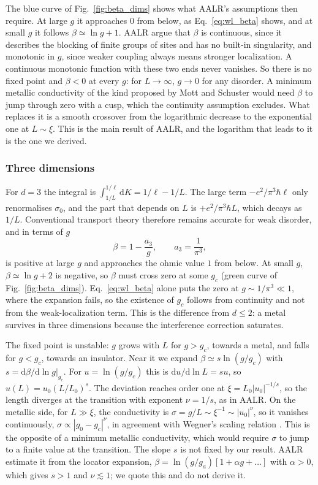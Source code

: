 The blue curve of Fig.~\ref{fig:beta_dims} shows what AALR's assumptions then require. At large $g$ it approaches $0$ from below, as Eq.~\eqref{eq:wl_beta} shows, and at small $g$ it follows $\beta\simeq\ln g+1$. AALR argue that $\beta$ is continuous, since it describes the blocking of finite groups of sites and has no built-in singularity, and monotonic in $g$, since weaker coupling always means stronger localization. A continuous monotonic function with these two ends never vanishes. So there is no fixed point and $\beta<0$ at every $g$: for $L\to\infty$, $g\to0$ for any disorder. A minimum metallic conductivity of the kind proposed by Mott and Schuster would need $\beta$ to jump through zero with a cusp, which the continuity assumption excludes. What replaces it is a smooth crossover from the logarithmic decrease to the exponential one at $L\sim\xi$. This is the main result of AALR, and the logarithm that leads to it is the one we derived.

\subsubsection*{Three dimensions}

For $d=3$ the integral is $\int_{1/L}^{1/\ell}\mathrm{d}K=1/\ell-1/L$. The large term $-e^2/\pi^3\hbar\ell$ only renormalises $\sigma_0$, and the part that depends on $L$ is $+e^2/\pi^3\hbar L$, which decays as $1/L$. Conventional transport theory therefore remains accurate for weak disorder, and in terms of $g$
\[
\beta=1-\frac{a_3}{g},\qquad a_3=\frac1{\pi^3},
\]
is positive at large $g$ and approaches the ohmic value $1$ from below. At small $g$, $\beta\simeq\ln g+2$ is negative, so $\beta$ must cross zero at some $g_c$ (green curve of Fig.~\ref{fig:beta_dims}). Eq.~\eqref{eq:wl_beta} alone puts the zero at $g\sim1/\pi^3\ll1$, where the expansion fails, so the existence of $g_c$ follows from continuity and not from the weak-localization term. This is the difference from $d\le2$: a metal survives in three dimensions because the interference correction saturates.

The fixed point is unstable: $g$ grows with $L$ for $g>g_c$, towards a metal, and falls for $g<g_c$, towards an insulator. Near it we expand $\beta\simeq s\ln(g/g_c)$ with $s=\mathrm{d}\beta/\mathrm{d}\ln g|_{g_c}$. For $u=\ln(g/g_c)$ this is $\mathrm{d}u/\mathrm{d}\ln L=su$, so $u(L)=u_0(L/L_0)^s$. The deviation reaches order one at $\xi=L_0|u_0|^{-1/s}$, so the length diverges at the transition with exponent $\nu=1/s$, as in AALR. On the metallic side, for $L\gg\xi$, the conductivity is $\sigma=g/L\sim\xi^{-1}\sim|u_0|^{\nu}$, so it vanishes continuously, $\sigma\propto|g_0-g_c|^{\nu}$, in agreement with Wegner's scaling relation \cite{Wegner1976}. This is the opposite of a minimum metallic conductivity, which would require $\sigma$ to jump to a finite value at the transition. The slope $s$ is not fixed by our result. AALR estimate it from the locator expansion, $\beta=\ln(g/g_a)[1+\alpha g+\dots]$ with $\alpha>0$, which gives $s>1$ and $\nu\lesssim1$; we quote this and do not derive it.

